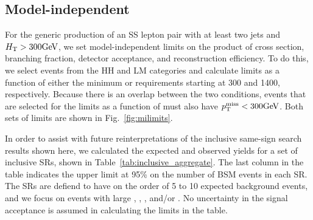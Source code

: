 \subsection{Model-independent}

For the generic production of an SS lepton pair with at least two jets and
$H_{\mathrm{T}}>300\text{GeV}$, we set model-independent limits on the product of cross section, branching fraction,
detector acceptance, and reconstruction efficiency.
To do this, we select events from the HH and LM categories and calculate limits
as a function of either the minimum \ptmiss or \HT requirements starting at 
300 and 1400\GeV, respectively. Because there is an overlap between the two conditions,
events that are selected for the limits as a function of \HT must also have 
$p_{\mathrm{T}}^\text{miss}<300\text{GeV}$. Both sets of limits are shown in Fig.~\ref{fig:milimits}.

In order to assist with future reinterpretations of the inclusive same-sign
search results shown here, we calculated the expected and observed yields for
a set of inclusive SRs, shown in Table~\ref{tab:inclusive_aggregate}. The
last column in the table indicates the upper limit at 95\% \CL on the number
of BSM events in each SR. The SRs are defiend to have on the order of 5 to 10
expected background events, and we focus on events with large \HT, \ptmiss,
\Nbjets, and/or \Njets. No uncertainty in the signal acceptance is assumed in
calculating the limits in the table.

